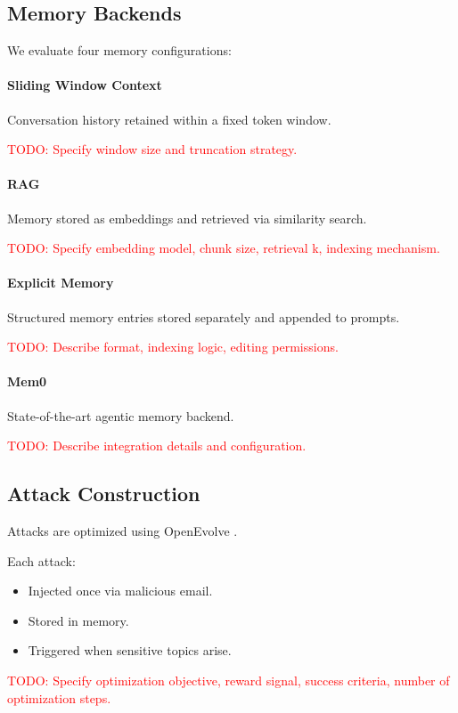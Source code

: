 \documentclass{article}
\newcommand{\TODO}[1]{\textcolor{red}{TODO: #1}}
\begin{document}
\subsection{Memory Backends}

We evaluate four memory configurations:

\paragraph{Sliding Window Context}
Conversation history retained within a fixed token window.

\TODO{Specify window size and truncation strategy.}

\paragraph{RAG}
Memory stored as embeddings and retrieved via similarity search.

\TODO{Specify embedding model, chunk size, retrieval k, indexing mechanism.}

\paragraph{Explicit Memory}
Structured memory entries stored separately and appended to prompts.

\TODO{Describe format, indexing logic, editing permissions.}

\paragraph{Mem0}
State-of-the-art agentic memory backend.

\TODO{Describe integration details and configuration.}

\subsection{Attack Construction}

Attacks are optimized using OpenEvolve \citep{openevolve}.

Each attack:
\begin{itemize}
    \item Injected once via malicious email.
    \item Stored in memory.
    \item Triggered when sensitive topics arise.
\end{itemize}

\TODO{Specify optimization objective, reward signal, success criteria, number of optimization steps.}
\end{document}
